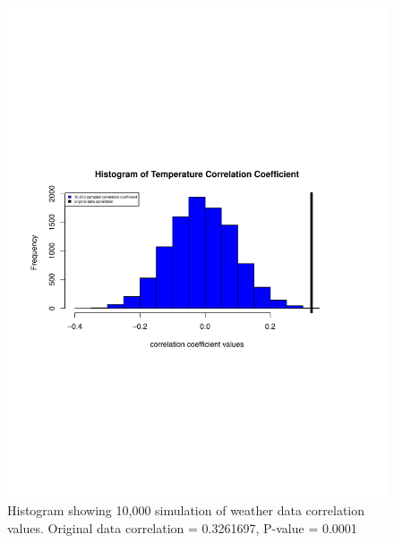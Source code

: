 \documentclass[12pt]{article}
\begin{document}
    \begin{figure}[t!]
        \caption{Histogram showing 10,000 simulation of weather data correlation values. Original data correlation = 0.3261697, P-value = 0.0001}
            \includegraphics[width=1.2\textwidth]{../Results/TAAutoCorrRplot.pdf}
                \centering
    \end{figure}
\end{document}
